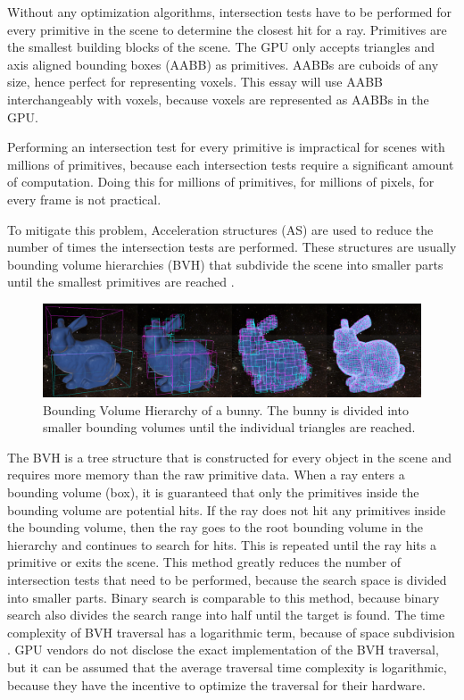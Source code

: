 \documentclass[12pt]{article}
\begin{document}
Without any optimization algorithms, intersection tests have to be performed for every primitive in the scene to determine the closest hit for a ray.
Primitives are the smallest building blocks of the scene. The GPU only accepts triangles and axis aligned bounding boxes (AABB) as primitives.
AABBs are cuboids of any size, hence perfect for representing voxels.
This essay will use AABB interchangeably with voxels, because voxels are represented as AABBs in the GPU.

Performing an intersection test for every primitive is impractical for scenes with millions of primitives, because each intersection tests require a significant amount of computation.
Doing this for millions of primitives, for millions of pixels, for every frame is not practical.

To mitigate this problem, Acceleration structures (AS) are used to reduce the number of times the intersection tests are performed.
These structures are usually bounding volume hierarchies (BVH) that subdivide the scene into smaller parts until the smallest primitives are reached \parencite{NVIDIA:Raytracing}.

\begin{figure}[H]
    \includegraphics[scale=0.22]{BVH-Visualization}
    \caption{
        Bounding Volume Hierarchy of a bunny.
        The bunny is divided into smaller bounding volumes until the individual triangles are reached.
        \parencite{Medium:BVH-Visualization}
    }
    \label{fig:BVH-Visualization}
\end{figure}

The BVH is a tree structure that is constructed for every object in the scene and requires more memory than the raw primitive data.
When a ray enters a bounding volume (box), it is guaranteed that only the primitives inside the bounding volume are potential hits.
If the ray does not hit any primitives inside the bounding volume, then the ray goes to the root bounding volume in the hierarchy and continues
to search for hits. This is repeated until the ray hits a primitive or exits the scene.
This method greatly reduces the number of intersection tests that need to be performed, because the search space is divided into smaller parts.
Binary search is comparable to this method, because binary search also divides the search range into half until the target is found.
The time complexity of BVH traversal has a logarithmic term, because of space subdivision \parencite[Chapter~16]{NVIDIA:RTGems2}.
GPU vendors do not disclose the exact implementation of the BVH traversal,
but it can be assumed that the average traversal time complexity is logarithmic, because they
have the incentive to optimize the traversal for their hardware.
\end{document}
